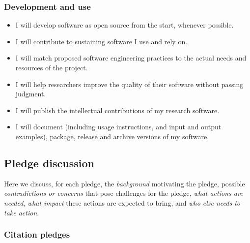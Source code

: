 \documentclass[a4paper,UKenglish]{dagman}
\renewcommand{\paragraph}[1]{\subsubsection*{#1}\xspace}
\begin{document}
\paragraph{Development and use}
\begin{itemize}
\item I will develop software as open source from the start, whenever possible.
\item I will contribute to sustaining software I use and rely on.
\item I will match proposed software engineering practices to the actual needs and resources of the project.
\item I will help researchers improve the quality of their software without passing judgment.
\item I will publish the intellectual contributions of my research software.
\item I will document (including usage instructions, and input and output examples), package, release and archive versions of my software.
\end{itemize}


\clearpage
\subsection{Pledge discussion}

Here we discuss, for each pledge, the \emph{background} motivating the pledge, possible \emph{contradictions or concerns} that pose challenges for the pledge, \emph{what actions are needed}, \emph{what impact} these actions are expected to bring, and \emph{who else needs to take action}.



\subsubsection*{Citation pledges}
\end{document}
